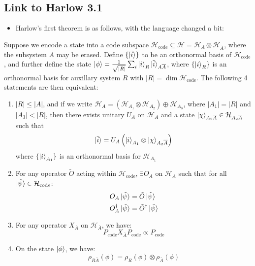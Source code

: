 \documentclass[12pt,a4paper]{article}
\numberwithin{equation}{section}
\begin{document}
	\subsection{Link to Harlow 3.1}
	\begin{itemize}
		\item Harlow's first theorem is as follows, with the language changed a bit:
	\end{itemize}
	Suppose we encode a state into a code subspace $\mathcal{H}_{\text{code}}\subseteq \mathcal{H}=\mathcal{H}_{A}\otimes\mathcal{H}_{\overline{A}}$, where the subsystem $\overline{A}$ may be erased. Define $\{\ket{\tilde{i}}\}$ to be an orthonormal basis of $\mathcal{H}_{\text{code}}$, and further define the state $\ket{\phi}=\frac{1}{\sqrt{|R|}}\sum_{i}\ket{i}_{R}\ket{\tilde{i}}_{A\overline{A}}$, where $\{\ket{i}_{R}\}$ is an orthonormal basis for auxillary system $R$ with $|R|=\dim{\mathcal{H}_{\text{code}}}$. The following 4 statements are then equivalent:
	\begin{enumerate}
		\item $|R|\leq |A|$, and if we write $\mathcal{H}_{A}=(\mathcal{H}_{A_{1}}\otimes\mathcal{H}_{A_{2}})\oplus\mathcal{H}_{A_{3}}$, where $|A_{1}|=|R|$ and $|A_{3}|<|R|$, then there exists unitary $U_{A}$ on $\mathcal{H}_{A}$ and a state $\ket{\chi}_{A_{2}\overline{A}}\in\mathcal{H}_{A_{2}\overline{A}}$ such that
		\begin{equation}
			\ket{\tilde{i}}=U_{A}\left(\ket{i}_{A_{1}}\otimes\ket{\chi}_{A_{2}\overline{A}}\right)
		\end{equation}
		where $\{\ket{i}_{A_{1}}\}$ is an orthonormal basis for $\mathcal{H}_{A_{1}}$
		\item For any operator $\tilde{O}$ acting within $\mathcal{H}_{\text{code}}$, $\exists O_{A}$ on $\mathcal{H}_{A}$ such that for all $\ket{\tilde{\psi}}\in\mathcal{H}_{\text{code}}$:
		\begin{equation}
			\begin{aligned}
				O_{A}\ket{\tilde{\psi}}&=\tilde{O}\ket{\tilde{\psi}}\\
				O_{A}^{\dagger}\ket{\tilde{\psi}}&=\tilde{O}^{\dagger}\ket{\tilde{\psi}}
			\end{aligned}
		\end{equation}
		\item For any operator $X_{\overline{A}}$ on $\mathcal{H}_{\overline{A}}$, we have:
		\begin{equation}
			P_{\text{code}}X_{\overline{A}}P_{\text{code}}\propto P_{\text{code}}
		\end{equation}
		\item On the state $\ket{\phi}$, we have:
		\begin{equation}
			\rho_{R\overline{A}}(\phi)=\rho_{R}(\phi)\otimes \rho_{\overline{A}}(\phi)
		\end{equation}
	\end{enumerate}
\end{document}
